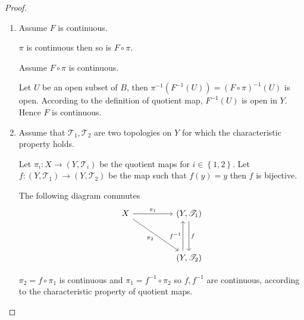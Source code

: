 \begin{proof}
    \begin{enumerate}[itemsep=0pt,label={(\alph*)}]
        \item Assume \( F \) is continuous.

              \( \pi \) is continuous then so is \( F \circ \pi \).

              Assume \( F \circ \pi \) is continuous.

              Let \( U \) be an open subset of \( B \), then \( \pi^{-1}(F^{-1}(U)) = {(F \circ \pi)}^{-1}(U) \) is open. According to the definition of quotient map, \( F^{-1}(U) \) is open in \( Y \). Hence \( F \) is continuous.
        \item Assume that \( \mathscr{T}_{1}, \mathscr{T}_{2} \) are two topologies on \( Y \) for which the characteristic property holds.

              Let \( \pi_{i}: X \to (Y, \mathscr{T}_{i}) \) be the quotient maps for \( i \in \left\{ 1, 2 \right\} \). Let \( f: (Y, \mathscr{T}_{1}) \to (Y, \mathscr{T}_{2}) \) be the map such that \( f(y) = y \) then \( f \) is bijective.

              The following diagram commutes
              \[
                  \begin{tikzcd}
                      X && {(Y, \mathscr{T}_{1})} \\
                      \\
                      && {(Y, \mathscr{T}_{2})}
                      \arrow["{\pi_{1}}", from=1-1, to=1-3]
                      \arrow["{\pi_{2}}"', from=1-1, to=3-3]
                      \arrow["f", from=1-3, to=3-3]
                      \arrow["{f^{-1}}", shift left=3, from=3-3, to=1-3]
                  \end{tikzcd}
              \]

              \( \pi_{2} = f \circ \pi_{1} \) is continuous and \( \pi_{1} = f^{-1} \circ \pi_{2} \) so \( f, f^{-1} \) are continuous, according to the characteristic property of quotient maps.


\end{enumerate}
\end{proof}
